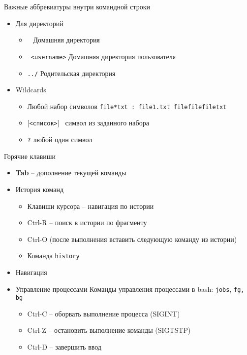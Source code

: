 \documentclass[ignorenonframetext, professionalfonts, hyperref={pdftex, unicode}]{beamer}
\begin{document}
\begin{frame}{Важные аббревиатуры внутри командной строки}
  \begin{itemize}
    \item Для директорий
    \begin{itemize}
      \item {\tt ~} Домашняя директория
      \item {\tt ~<username>} Домашняя директория пользователя
      \item {\tt ../} Родительская директория
    \end{itemize}
  \pause  
  \item Wildcards
    \begin{itemize}
      \item {\tt *} Любой набор символов {\tt file*txt : file1.txt filefilefiletxt}
      \item {\tt $[$<список>$]$ } символ из заданного набора {\tt }
      \item {\tt ?} любой один символ
     \end{itemize}

  \end{itemize}
\end{frame}       
\begin{frame}{Горячие клавиши}
  \begin{itemize}
    \item \textbf{Tab} -- дополнение текущей команды
     \pause
    \item История команд
      \begin{itemize}
        \item Клавиши курсора -- навигация по истории
        \item Ctrl-R -- поиск в истории по фрагменту
        \item Ctrl-O (после выполнения вставить следующую команду из истории)
        \item Команда {\tt history}
       \end{itemize}
    \item Навигация
	\item Управление процессами
		Команды управления процессами в bash: {\tt jobs}, {\tt fg, \tt bg}
	  \begin{itemize}
		\item Ctrl-C -- оборвать выполнение процесса (SIGINT)
		\item Ctrl-Z -- остановить выполнение команды (SIGTSTP)
		\item Ctrl-D -- завершить ввод
	  \end{itemize}
   \end{itemize}
\end{frame}
\end{document}
